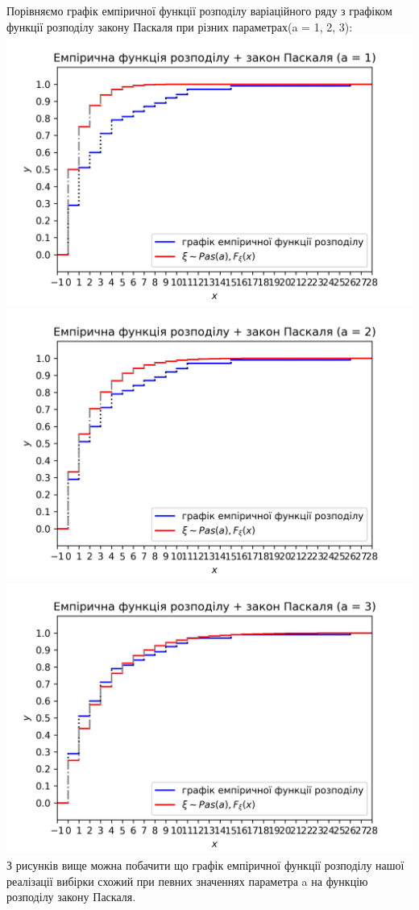 \documentclass{article}
\begin{document}
\newline
Порівняємо графік емпіричної функції розподілу варіаційного ряду 
з графіком функції розподілу закону Паскаля при 
різних параметрах(a = 1, 2, 3):
\newline
\includegraphics[scale = 0.8]{func+geom4}
\newline
\includegraphics[scale = 0.8]{func+geom3}
\newline
\includegraphics[scale = 0.8]{func+geom2}
\newline
З рисунків вище можна побачити що графік емпіричної функції
розподілу нашої реалізації вибірки схожий при певних значеннях
параметра a на функцію розподілу закону Паскаля.
\end{document}
